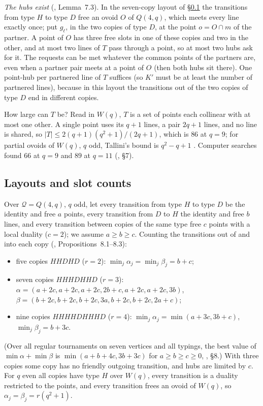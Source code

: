 \documentclass[11pt]{amsart}
\theoremstyle{definition}
\theoremstyle{remark}
\newcommand{\cQ}{\mathcal{Q}}
\begin{document}
\emph{The hubs exist} (, Lemma~7.3). In the seven-copy layout of \S\ref{ssec:layouts} the transitions from type $H$ to type $D$ free an ovoid $O$ of $Q(4,q)$, which meets every line exactly once; put $g_\ell$, in the two copies of type $D$, at the point $o=O\cap m$ of the partner. A point of $O$ has three free slots in one of these copies and two in the other, and at most two lines of $T$ pass through a point, so at most two hubs ask for it. The requests can be met whatever the common points of the partners are, even when a partner pair meets at a point of $O$ (then both hubs sit there). One point-hub per partnered line of $T$ suffices (so $K'$ must be at least the number of partnered lines), because in this layout the transitions out of the two copies of type $D$ end in different copies.

How large can $T$ be? Read in $W(q)$, $T$ is a set of points each collinear with at most one other. A single point uses its $q+1$ lines, a pair $2q+1$ lines, and no line is shared, so $|T|\le 2(q+1)(q^2+1)/(2q+1)$, which is $86$ at $q=9$; for partial ovoids of $W(q)$, $q$ odd, Tallini's bound is $q^2-q+1$ \cite{Ta91}. Computer searches found $66$ at $q=9$ and $89$ at $q=11$ (, \S7).

\subsection{Layouts and slot counts}\label{ssec:layouts}
Over $\cQ=Q(4,q)$, $q$ odd, let every transition from type $H$ to type $D$ be the identity and free $a$ points, every transition from $D$ to $H$ the identity and free $b$ lines, and every transition between copies of the same type free $c$ points with a local duality ($c=2$); we assume $a\ge b\ge c$. Counting the transitions out of and into each copy (, Propositions~8.1--8.3):
\begin{itemize}[leftmargin=1.5em]
\item five copies $HHDHD$ ($r=2$): $\min_j\alpha_j=\min_j\beta_j=b+c$;
\item seven copies $HHHDHHD$ ($r=3$): $\alpha=(a+2c,a+2c,a+2c,2b+c,a+2c,a+2c,3b)$, $\beta=(b+2c,b+2c,b+2c,3a,b+2c,b+2c,2a+c)$;
\item nine copies $HHHHDHHHD$ ($r=4$): $\min_j\alpha_j=\min(a+3c,3b+c)$, $\min_j\beta_j=b+3c$.
\end{itemize}
(Over all regular tournaments on seven vertices and all typings, the best value of $\min\alpha+\min\beta$ is $\min(a+b+4c,3b+3c)$ for $a\ge b\ge c\ge0$, , \S8.) With three copies some copy has no friendly outgoing transition, and hubs are limited by $c$. For $q$ even all copies have type $H$ over $W(q)$, every transition is a duality restricted to the points, and every transition frees an ovoid of $W(q)$, so $\alpha_j=\beta_j=r(q^2+1)$.
\end{document}
